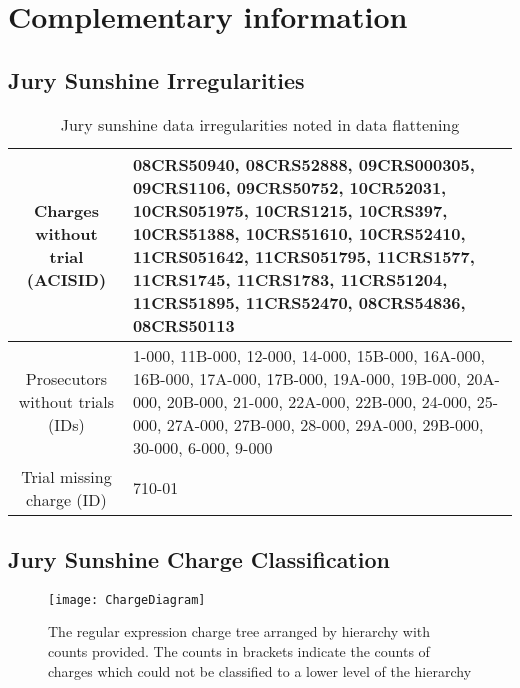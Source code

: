 \chapter{Complementary information}
\label{app:complement}

\section{Jury Sunshine Irregularities} \label{app:irregs}

\begin{table}[h]
  \caption[Jury Sunshine Irregularities]{\footnotesize Jury sunshine data irregularities noted in data flattening}
  \centering
  \begin{tabularx}{\textwidth}{|c|X|} \hline
    Charges without trial (ACISID) & 08CRS50940, 08CRS52888, 09CRS000305, 09CRS1106, 09CRS50752, 10CR52031, 10CRS051975,
    10CRS1215, 10CRS397, 10CRS51388, 10CRS51610, 10CRS52410, 11CRS051642, 11CRS051795, 11CRS1577, 11CRS1745, 11CRS1783,
    11CRS51204, 11CRS51895, 11CRS52470, 08CRS54836, 08CRS50113 \\ \hline 
    Prosecutors without trials (IDs) & 1-000, 11B-000, 12-000, 14-000, 15B-000, 16A-000,
                     16B-000, 17A-000, 17B-000, 19A-000, 19B-000,
                     20A-000, 20B-000, 21-000, 22A-000, 22B-000,
                     24-000, 25-000, 27A-000, 27B-000, 28-000,
                                       29A-000, 29B-000, 30-000, 6-000, 9-000 \\ \hline
    Trial missing charge (ID) & 710-01 \\ \hline
  \end{tabularx}
\end{table}

\section{Jury Sunshine Charge Classification} \label{app:charge}

\begin{figure}[!h]
  \centering
  \texttt{[image: ChargeDiagram]}
  \caption[Regular Expression Charge Tree]{\footnotesize The regular expression charge tree arranged by hierarchy with counts
    provided. The counts in brackets indicate the counts of charges which could not be classified to a lower level of the
    hierarchy}
  \label{fig:chargetree}
\end{figure}

